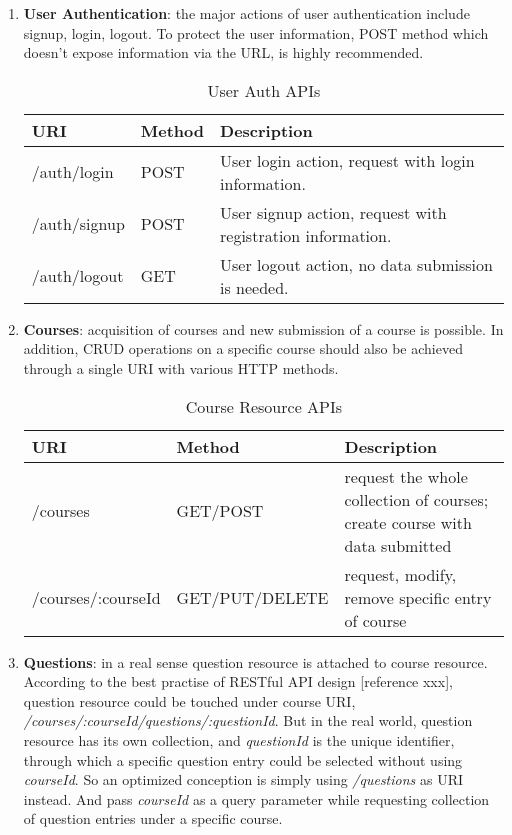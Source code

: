 \begin{enumerate}
\item
\textbf{User Authentication}: the major actions of user authentication include signup, login, logout. To protect the user information, POST method which doesn't expose information via the URL, is highly recommended.

\begin{table}[!htbp]
\centering
\begin{tabularx}{\textwidth}{@{}llX@{}}
\toprule
URI          & Method & Description                                                  \\ \midrule
/auth/login  & POST   & User login action, request with login information.           \\
/auth/signup & POST   & User signup action, request with registration information.   \\
/auth/logout & GET    & User logout action, no data submission is needed.            \\ \bottomrule
\end{tabularx}
\caption{User Auth APIs}
\label{user-auth-apis}
\end{table}

\item
\textbf{Courses}: acquisition of courses and new submission of a course is possible. In addition, \gls{CRUD} operations on a specific course should also be achieved through a single URI with various HTTP methods.

\begin{table}[!htbp]
\centering

\begin{tabularx}{\textwidth}{@{}llX@{}}
\toprule
URI                 & Method         & Description                                                                                                          \\ \midrule
/courses            & GET/POST       & request the whole collection of courses; create course with data submitted \\
/courses/:courseId & GET/PUT/DELETE & request, modify, remove specific entry of course                                                                     \\ \bottomrule
\end{tabularx}
\caption{Course Resource APIs}
\label{course-resource-apis}
\end{table}

\item
\textbf{Questions}: in a real sense question resource is attached to course resource. According to the best practise of RESTful API design [reference xxx], question resource could be touched under course URI, \textit{/courses/:courseId/questions/:questionId}. But in the real world, question resource has its own collection, and \textit{questionId} is the unique identifier, through which a specific question entry could be selected without using  
\textit{courseId}. So an optimized conception is simply using \textit{/questions} as URI instead. And pass \textit{courseId} as a query parameter while requesting collection of question entries under a specific course. 
\begin{table}[!htbp]
\centering


\end{table}
\end{enumerate}
